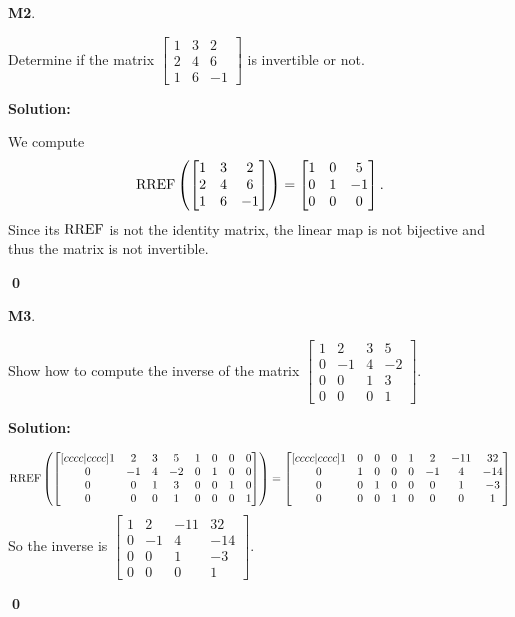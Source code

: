 \documentclass{article}
\newenvironment{problem}[1]
{
  \begin{flushleft}
  \textbf{#1}.
  \ignorespaces
}
{
  \end{flushleft}
}
\newenvironment{solution}
{
  \ignorespaces
  \textbf{Solution:}
}
{
  \ignorespacesafterend
  \begin{flushright}
  {\bfseries \qed}
  \end{flushright}
}
\begin{document}
\begin{problem}{M2}
Determine if the matrix \(\begin{bmatrix}1 & 3 & 2  \\ 2 & 4 & 6  \\ 1 & 6 & -1 \end{bmatrix}\) is invertible or not.
\end{problem}
\begin{solution}
We compute
\[\operatorname{RREF}\left(\begin{bmatrix}1 & 3 & 2  \\ 2 & 4 & 6  \\ 1 & 6 & -1 \end{bmatrix}\right) = \begin{bmatrix} 1 & 0 & 5 \\ 0 & 1 & -1 \\ 0 & 0 & 0 \end{bmatrix}.\]
Since its \(\operatorname{RREF}\) is not the identity matrix, the linear map is not bijective and thus the matrix is not invertible.
\end{solution}

\begin{problem}{M3}
Show how to compute the inverse of the matrix
\(\begin{bmatrix}
1 & 2 & 3 & 5 \\ 0 & -1 & 4 & -2 \\ 0 & 0 & 1 & 3 \\ 0 & 0 & 0 & 1
\end{bmatrix}\).
\end{problem}
\begin{solution}
\[\operatorname{RREF}\left(\begin{bmatrix}[cccc|cccc] 1 & 2 & 3 & 5 & 1 & 0 & 0 & 0  \\ 0 & -1 & 4 & -2 & 0 & 1 & 0 & 0 \\ 0 & 0 & 1 & 3 & 0 & 0 & 1 & 0 \\ 0 & 0 & 0 & 1 & 0 & 0 & 0 & 1 \end{bmatrix}\right) = \begin{bmatrix}[cccc|cccc] 1 & 0 & 0 &0 & 1 & 2 & -11 & 32 \\ 0 & 1 & 0 & 0 & 0 & -1 & 4 & -14 \\ 0 & 0 & 1 & 0 & 0 & 0 & 1 & -3 \\ 0 & 0 & 0 & 1 & 0 & 0 & 0 & 1 \end{bmatrix}\]
So the inverse is \(\begin{bmatrix}  1 & 2 & -11 & 32 \\ 0 & -1 & 4 & -14 \\  0 & 0 & 1 & -3 \\ 0 & 0 & 0 & 1 \end{bmatrix}\).
\end{solution}
\end{document}
